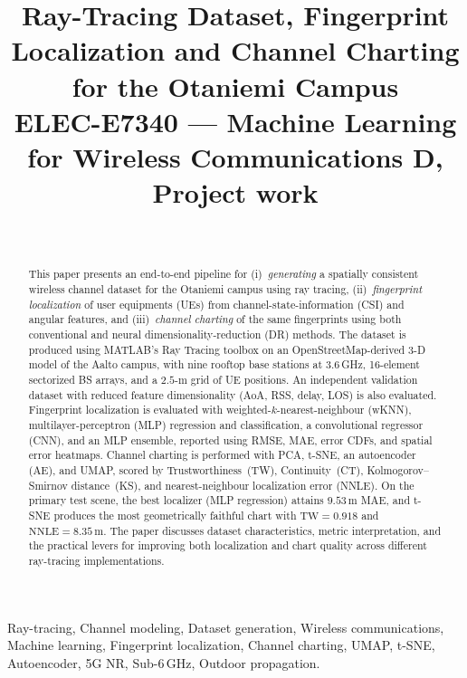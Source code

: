 \documentclass[journal,comsoc]{IEEEtran}
\begin{document}
\title{Ray-Tracing Dataset, Fingerprint Localization and
       Channel Charting for the Otaniemi Campus\\
\large ELEC-E7340 --- Machine Learning for Wireless Communications D, Project work}
\author{%
 \\
%
}

\maketitle


\begin{abstract}
This paper presents an end-to-end pipeline for
(i)~\emph{generating} a spatially consistent wireless channel dataset for the
Otaniemi campus using ray tracing, (ii)~\emph{fingerprint localization} of user
equipments (UEs) from channel-state-information (CSI) and angular features, and
(iii)~\emph{channel charting} of the same fingerprints using both
conventional and neural dimensionality-reduction (DR) methods.
The dataset is produced using MATLAB's Ray Tracing toolbox on an OpenStreetMap-derived
3-D model of the Aalto campus, with nine rooftop base stations at 3.6\,GHz, 16-element
sectorized BS arrays, and a $2.5$-m grid of UE positions. An independent validation
dataset with reduced feature dimensionality (AoA, RSS, delay, LOS) is also evaluated.
Fingerprint localization is evaluated with weighted-$k$-nearest-neighbour
(wKNN), multilayer-perceptron (MLP) regression and classification, a
convolutional regressor (CNN), and an MLP ensemble, reported using
RMSE, MAE, error CDFs, and spatial error heatmaps.
Channel charting is performed with PCA, t-SNE, an autoencoder (AE), and UMAP,
scored by Trustworthiness~(TW), Continuity~(CT), Kolmogorov--Smirnov distance~(KS), and
nearest-neighbour localization error (NNLE).
On the primary test scene, the best localizer (MLP regression) attains
$9.53\,$m MAE, and t-SNE produces the most geometrically faithful chart with
$\mathrm{TW}=0.918$ and $\mathrm{NNLE}=8.35\,$m.
The paper discusses dataset characteristics, metric interpretation, and the
practical levers for improving both localization and chart quality across different ray-tracing implementations.
\end{abstract}

\begin{IEEEkeywords}
Ray-tracing, Channel modeling, Dataset generation, Wireless communications,
Machine learning, Fingerprint localization, Channel charting, UMAP, t-SNE,
Autoencoder, 5G NR, Sub-6\,GHz, Outdoor propagation.
\end{IEEEkeywords}
\end{document}
